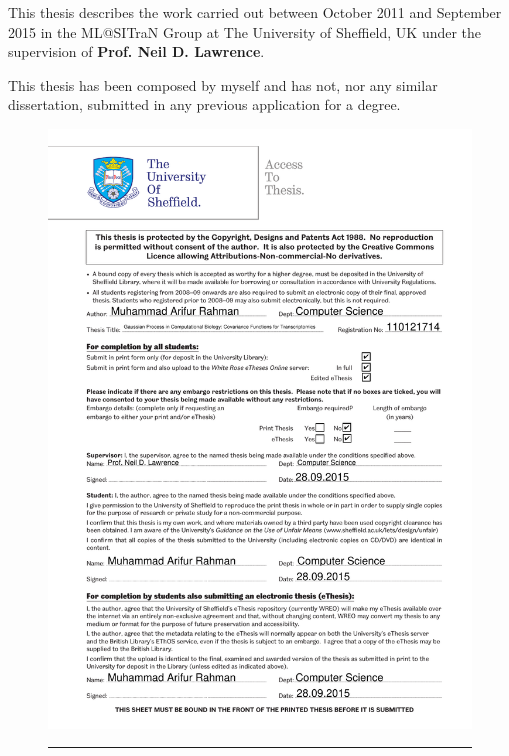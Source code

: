 
\ifpdf
    \graphicspath{{Declaration/Figs/Raster/}{Declaration/Figs/PDF/}{Declaration/Figs/}}
\else
    \graphicspath{{Declaration/Figs/Vector/}{Declaration/Figs/}}
\fi

\begin{declaration}
This thesis describes the work carried out between October 2011 and September 2015 in the ML@SITraN Group at The University of Sheffield, UK under the supervision of \textbf{Prof. Neil D. Lawrence}.

This thesis has been composed by myself and has not, nor any similar dissertation, submitted in
any previous application for a degree.

\begin{figure}
	\centering
	\includegraphics[width=\textwidth,keepaspectratio]{Access-to-Thesis-Arif.pdf}
		\rule{35em}{0.5pt}
	
\end{figure}


\end{declaration}



